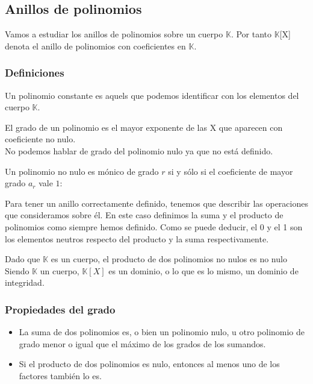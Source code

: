 \documentclass[nochap]{apuntes}
\begin{document}
\subsection{Anillos de polinomios}

Vamos a estudiar los anillos de polinomios sobre un cuerpo $\mathbb{K}$. Por tanto $\mathbb{K}$[X] denota el anillo de polinomios con 
coeficientes en $\mathbb{K}$.

\subsubsection{Definiciones}
\begin{defn} Un polinomio constante es aquels que podemos identificar con los elementos del cuerpo $\mathbb{K}$.
\end{defn}

\begin{defn}
 El grado de un polinomio es el mayor exponente de las X que aparecen con coeficiente no nulo.\\
 No podemos hablar de grado del polinomio nulo ya que no está definido.
\end{defn}

\begin{defn}
 Un polinomio no nulo es mónico de grado $r$ si y sólo si el coeficiente de mayor grado $a_r$ vale $1$:
\end{defn}

Para tener un anillo correctamente definido, tenemos que describir las operaciones que consideramos sobre él. En este caso definimos la suma y el producto de polinomios como siempre hemos definido. Como se puede deducir, el 0 y el 1 son los elementos neutros respecto del producto y la suma respectivamente.

\obs Dado que $\mathbb{K}$  es un cuerpo, el producto de dos polinomios no nulos es no nulo
\obs Siendo $\mathbb{K}$ un cuerpo, $\mathbb{K}[X]$ es un dominio, o lo que es lo mismo, un dominio de integridad.

\subsubsection{Propiedades del grado}
\begin{itemize}
 \item La suma de dos polinomios es, o bien un polinomio nulo, u otro polinomio de grado menor o igual que el máximo de los grados de los sumandos.
 \item Si el producto de dos polinomios es nulo, entonces al menos uno de los factores también lo es.
\end{itemize}
\end{document}
